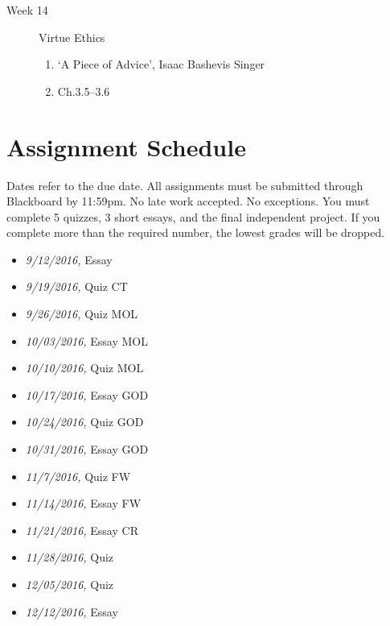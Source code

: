 \documentclass[article,oneside]{memoir}
\begin{document}
\begin{description}
\begin{enumerate}
\end{enumerate}

\item[Week 14] Virtue Ethics
\begin{enumerate}
\item `A Piece of Advice', Isaac Bashevis Singer
\item Ch.3.5--3.6
\end{enumerate}



\end{description}





\section{ Assignment Schedule}
Dates refer to the due date. All assignments must be submitted through Blackboard by 11:59pm. No late work accepted. No exceptions. You must complete 5 quizzes, 3 short essays, and the final independent project. If you complete more than the required number, the lowest grades will be dropped.
\begin{itemize}
\item \textit{9/12/2016,} Essay 
\item \textit{9/19/2016,} Quiz CT 
\item \textit{9/26/2016,} Quiz MOL
\item \textit{10/03/2016,} Essay MOL
\item \textit{10/10/2016,} Quiz MOL
\item \textit{10/17/2016,} Essay GOD
\item \textit{10/24/2016,}  Quiz GOD
\item \textit{10/31/2016,} Essay GOD
\item \textit{11/7/2016,}  Quiz FW
\item \textit{11/14/2016,} Essay FW
\item \textit{11/21/2016,} Essay CR
\item \textit{11/28/2016,} Quiz
\item \textit{12/05/2016,} Quiz 
\item \textit{12/12/2016,} Essay 
\end{itemize}




\end{document}

